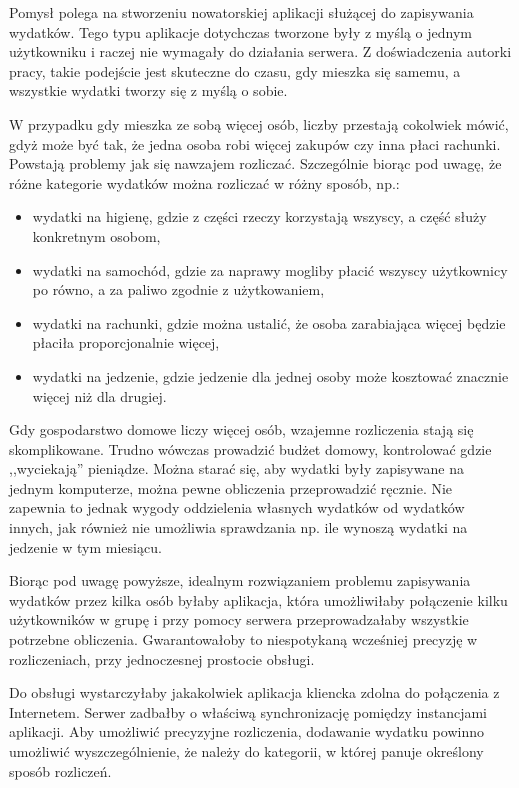 \documentclass[12pt,a4paper,twoside,titlepage,openright]{book}
\begin{document}
Pomysł polega na stworzeniu nowatorskiej aplikacji służącej do zapisywania wydatków. Tego typu aplikacje dotychczas tworzone były z myślą o jednym użytkowniku i raczej nie wymagały do działania serwera. Z doświadczenia autorki pracy, takie podejście jest skuteczne do czasu, gdy mieszka się samemu, a wszystkie wydatki tworzy się z myślą o sobie. 

W przypadku gdy mieszka ze sobą więcej osób, liczby przestają cokolwiek mówić, gdyż może być tak, że jedna osoba robi więcej zakupów czy inna płaci rachunki. Powstają problemy jak się nawzajem rozliczać. Szczególnie biorąc pod uwagę, że różne kategorie wydatków można rozliczać w różny sposób, np.:
\begin{itemize}
\item wydatki na higienę, gdzie z części rzeczy korzystają wszyscy, a część służy konkretnym osobom,
\item wydatki na samochód, gdzie za naprawy mogliby płacić wszyscy użytkownicy po równo, a za paliwo zgodnie z użytkowaniem,
\item wydatki na rachunki, gdzie można ustalić, że osoba zarabiająca więcej będzie płaciła proporcjonalnie więcej,
\item wydatki na jedzenie, gdzie jedzenie dla jednej osoby może kosztować znacznie więcej niż dla drugiej.
\end{itemize}
Gdy gospodarstwo domowe liczy więcej osób, wzajemne rozliczenia stają się skomplikowane. Trudno wówczas prowadzić budżet domowy, kontrolować gdzie ,,wyciekają'' pieniądze. Można starać się, aby wydatki były zapisywane na jednym komputerze, można pewne obliczenia przeprowadzić ręcznie. Nie zapewnia to jednak wygody oddzielenia własnych wydatków od wydatków innych, jak również nie umożliwia sprawdzania np. ile wynoszą wydatki na jedzenie w tym miesiącu.

Biorąc pod uwagę powyższe, idealnym rozwiązaniem problemu zapisywania wydatków przez kilka osób byłaby aplikacja, która umożliwiłaby połączenie kilku użytkowników w grupę i przy pomocy serwera przeprowadzałaby wszystkie potrzebne obliczenia. Gwarantowałoby to niespotykaną wcześniej precyzję w rozliczeniach, przy jednoczesnej prostocie obsługi. 

Do obsługi wystarczyłaby jakakolwiek aplikacja kliencka zdolna do połączenia z Internetem. Serwer zadbałby o właściwą synchronizację pomiędzy instancjami aplikacji. Aby umożliwić precyzyjne rozliczenia, dodawanie wydatku powinno umożliwić wyszczególnienie, że należy do kategorii, w której panuje określony sposób rozliczeń. 
\end{document}
